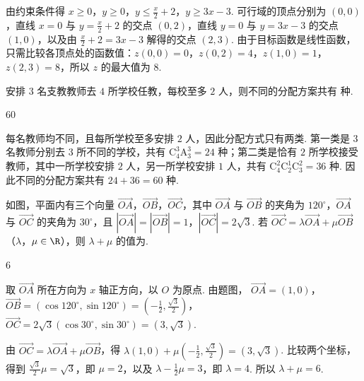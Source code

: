\begin{solution}
由约束条件得 \(x\geqslant0\)，\(y\geqslant0\)，\(y\leqslant\frac{x}{2}+2\)，\(y\geqslant3x-3\). 可行域的顶点分别为 \(\left(0,0\right)\)，直线 \(x=0\) 与 \(y=\frac{x}{2}+2\) 的交点 \(\left(0,2\right)\)，直线 \(y=0\) 与 \(y=3x-3\) 的交点 \(\left(1,0\right)\)，以及由 \(\frac{x}{2}+2=3x-3\) 解得的交点 \(\left(2,3\right)\). 由于目标函数是线性函数，只需比较各顶点处的函数值：\(z\left(0,0\right)=0\)，\(z\left(0,2\right)=4\)，\(z\left(1,0\right)=1\)，\(z\left(2,3\right)=8\)，所以 \(z\) 的最大值为 \(8\).
\end{solution}

\begin{problem}
安排 \(3\) 名支教教师去 \(4\) 所学校任教，每校至多 \(2\) 人，则不同的分配方案共有\fillinblank{} 种.
\end{problem}

\begin{answer}
\(60\)
\end{answer}

\begin{solution}
每名教师均不同，且每所学校至多安排 \(2\) 人，因此分配方式只有两类. 第一类是 \(3\) 名教师分别去 \(3\) 所不同的学校，共有 \(\mathrm C_4^3\mathrm A_3^3=24\) 种；第二类是恰有 \(2\) 所学校接受教师，其中一所学校安排 \(2\) 人，另一所学校安排 \(1\) 人，共有 \(\mathrm C_4^2\mathrm C_2^1\mathrm C_3^2=36\) 种. 因此不同的分配方案共有 \(24+36=60\) 种.
\end{solution}

\begin{problem}
如图，平面内有三个向量 \(\overrightarrow{OA}\)，\(\overrightarrow{OB}\)，\(\overrightarrow{OC}\)，其中 \(\overrightarrow{OA}\) 与 \(\overrightarrow{OB}\) 的夹角为 \(120^{\circ}\)，\(\overrightarrow{OA}\) 与 \(\overrightarrow{OC}\) 的夹角为 \(30^{\circ}\)，且 \(\left|\overrightarrow{OA}\right| = \left|\overrightarrow{OB}\right| = 1\)，\(\left|\overrightarrow{OC}\right| = 2\sqrt{3}\). 若 \(\overrightarrow{OC} = \lambda \overrightarrow{OA} + \mu \overrightarrow{OB}\)（\(\lambda\)，\(\mu \in \R\)），则 \(\lambda + \mu\) 的值为\fillinblank{}.

\end{problem}

\begin{answer}
\(6\)
\end{answer}

\begin{solution}
取 \(\overrightarrow{OA}\) 所在方向为 \(x\) 轴正方向，以 \(O\) 为原点. 由题图，
\(\overrightarrow{OA}=(1,0)\)，\(\overrightarrow{OB}=\left(\cos120^{\circ},\sin120^{\circ}\right)=\left(-\frac12,\frac{\sqrt3}{2}\right)\)，
\(\overrightarrow{OC}=2\sqrt3\left(\cos30^{\circ},\sin30^{\circ}\right)=\left(3,\sqrt3\right)\).

由 \(\overrightarrow{OC}=\lambda\overrightarrow{OA}+\mu\overrightarrow{OB}\)，得
\(\lambda\left(1,0\right)+\mu\left(-\frac12,\frac{\sqrt3}{2}\right)=\left(3,\sqrt3\right)\). 比较两个坐标，得到 \(\frac{\sqrt3}{2}\mu=\sqrt3\)，即 \(\mu=2\)，以及 \(\lambda-\frac12\mu=3\)，即 \(\lambda=4\). 所以 \(\lambda+\mu=6\).
\end{solution}

